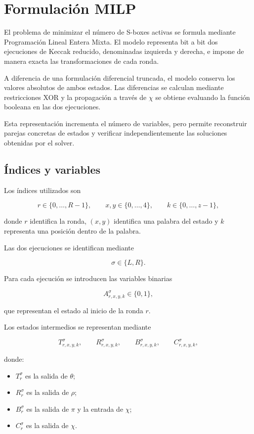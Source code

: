 \section{Formulación MILP}
\label{sec:formulacion_milp}

El problema de minimizar el número de S-boxes activas se formula mediante
Programación Lineal Entera Mixta. El modelo representa bit a bit dos
ejecuciones de Keccak reducido, denominadas izquierda y derecha, e impone
de manera exacta las transformaciones de cada ronda.

A diferencia de una formulación diferencial truncada, el modelo conserva
los valores absolutos de ambos estados. Las diferencias se calculan mediante
restricciones XOR y la propagación a través de $\chi$ se obtiene evaluando
la función booleana en las dos ejecuciones.

Esta representación incrementa el número de variables, pero permite
reconstruir parejas concretas de estados y verificar independientemente
las soluciones obtenidas por el solver.


\subsection{Índices y variables}
\label{subsec:variables_milp}

Los índices utilizados son

\[
r \in \{0,\ldots,R-1\},
\qquad
x,y \in \{0,\ldots,4\},
\qquad
k \in \{0,\ldots,z-1\},
\]

donde $r$ identifica la ronda, $(x,y)$ identifica una palabra del estado
y $k$ representa una posición dentro de la palabra.

Las dos ejecuciones se identifican mediante

\[
\sigma \in \{L,R\}.
\]

Para cada ejecución se introducen las variables binarias

\[
A_{r,x,y,k}^{\sigma} \in \{0,1\},
\]

que representan el estado al inicio de la ronda $r$.

Los estados intermedios se representan mediante

\[
T_{r,x,y,k}^{\sigma},
\qquad
R_{r,x,y,k}^{\sigma},
\qquad
B_{r,x,y,k}^{\sigma},
\qquad
C_{r,x,y,k}^{\sigma},
\]

donde:

\begin{itemize}
    \item $T^\sigma_r$ es la salida de $\theta$;
    \item $R^\sigma_r$ es la salida de $\rho$;
    \item $B^\sigma_r$ es la salida de $\pi$ y la entrada de $\chi$;
    \item $C^\sigma_r$ es la salida de $\chi$.
\end{itemize}

